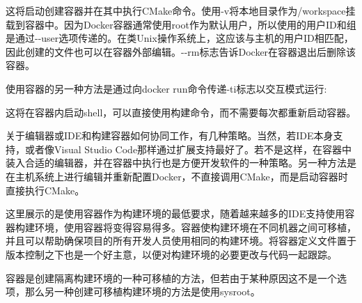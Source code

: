 这将启动创建容器并在其中执行CMake命令。使用-v将本地目录作为/workspace挂载到容器中。因为Docker容器通常使用root作为默认用户，所以使用的用户ID和组是通过-{}-user选项传递的。在类Unix操作系统上，这应该与主机的用户ID相匹配，因此创建的文件也可以在容器外部编辑。-{}-rm标志告诉Docker在容器退出后删除该容器。

使用容器的另一种方法是通过向docker run命令传递-ti标志以交互模式运行:


这将在容器内启动shell，可以直接使用构建命令，而不需要每次都重新启动容器。

关于编辑器或IDE和构建容器如何协同工作，有几种策略。当然，若IDE本身支持，或者像Visual Studio Code那样通过扩展支持最好了。若不是这样，在容器中装入合适的编辑器，并在容器中执行也是方便开发软件的一种策略。另一种方法是在主机系统上进行编辑并重新配置Docker，不直接调用CMake，而是启动容器时直接执行CMake。

这里展示的是使用容器作为构建环境的最低要求，随着越来越多的IDE支持使用容器构建环境，使用容器将变得容易得多。容器使构建环境在不同机器之间可移植，并且可以帮助确保项目的所有开发人员使用相同的构建环境。将容器定义文件置于版本控制之下也是一个好主意，以便对构建环境的必要更改与代码一起跟踪。

容器是创建隔离构建环境的一种可移植的方法，但若由于某种原因这不是一个选项，那么另一种创建可移植构建环境的方法是使用sysroot。



















